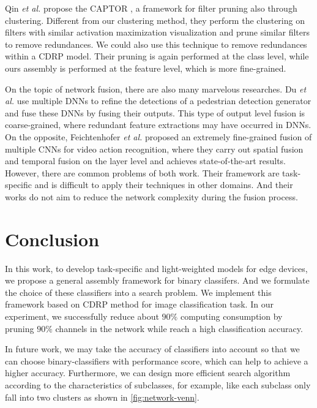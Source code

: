 \documentclass[sigplan,10pt,review]{acmart}\settopmatter{printfolios=true,printccs=false,printacmref=false}
\begin{document}
Qin \textit{et al.} propose the CAPTOR \cite{qin2019captor}, a framework for filter pruning also through clustering.
Different from our clustering method, they perform the clustering on filters with similar activation maximization visualization and prune similar filters to remove redundances.
We could also use this technique to remove redundances within a CDRP model.
Their pruning is again performed at the class level, while ours assembly is performed at the feature level, which is more fine-grained.

On the topic of network fusion, there are also many marvelous researches.
Du \textit{et al.} \cite{du2017fused} use multiple DNNs to refine the detections of a pedestrian detection generator and fuse these DNNs by fusing their outputs.
This type of output level fusion is coarse-grained, where redundant feature extractions may have occurred in DNNs.
On the opposite, Feichtenhofer \textit{et al.} \cite{feichtenhofer2016convolutional} proposed an extremely fine-grained fusion of multiple CNNs for video action recognition, where they carry out spatial fusion and temporal fusion on the layer level and achieves state-of-the-art results.
However, there are common problems of both work.
Their framework are task-specific and is difficult to apply their techniques in other domains.
And their works do not aim to reduce the network complexity during the fusion process.

\section{Conclusion}
In this work, to develop task-specific and light-weighted models for edge devices, we propose a general assembly framework for binary classifers. 
And we formulate the choice of these classifiers into a search problem. 
We implement this framework based on CDRP method for image classification task. 
In our experiment, we successfully reduce about $90\%$ computing consumption by pruning $90\%$ channels in the network while reach a high classification accuracy.

In future work, we may take the accuracy of classifiers into account so that we can choose binary-classifiers with performance score, which can help to achieve a higher accuracy. 
Furthermore, we can design more efficient search algorithm according to the characteristics of subclasses, for example, like each subclass only fall into two clusters as shown in  \cref{fig:network-venn}.



% 
% 




\end{document}
